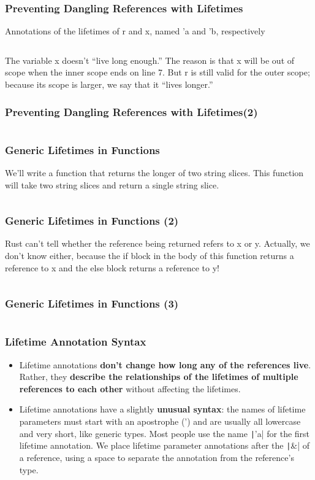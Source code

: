 \documentclass{beamer}
\begin{document}
\begin{frame}[fragile]
	\frametitle{Preventing Dangling References with Lifetimes}
	Annotations of the lifetimes of r and x, named 'a and 'b, respectively
	
	\inputminted{rust}{./code/dangling-ref.rs}
	
	The variable x doesn’t “live long enough.” The reason is that x will be out of scope when the inner scope ends on line 7. But r is still valid for the outer scope; because its scope is larger, we say that it “lives longer.” 
\end{frame}

\begin{frame}[fragile]
	\frametitle{Preventing Dangling References with Lifetimes(2)}
	\inputminted{shell}{./code/dangling-ref.shell}
\end{frame}


\begin{frame}[fragile]
	\frametitle{Generic Lifetimes in Functions}
	We’ll write a function that returns the longer of two string slices. This function will take two string slices and return a single string slice.
	
	\inputminted{rust}{./code/lifetime.rs}
\end{frame}



\begin{frame}[fragile]
	\frametitle{Generic Lifetimes in Functions (2)}
	Rust can’t tell whether the reference being returned refers to x or y. Actually, we don’t know either, because the if block in the body of this function returns a reference to x and the else block returns a reference to y!
	
	\inputminted{rust}{./code/lifetime2.rs}
\end{frame}


\begin{frame}[fragile]
	\frametitle{Generic Lifetimes in Functions (3)}
	\inputminted{shell}{./code/lifetime2.shell}
\end{frame}

\begin{frame}[fragile]
	\frametitle{Lifetime Annotation Syntax}
	\begin{itemize}
		\item 	Lifetime annotations \textbf{don’t change how long any of the references live}. Rather, they \textbf{describe the relationships of the lifetimes of multiple references to each other }without affecting the lifetimes.
		\item 	Lifetime annotations have a slightly \textbf{unusual syntax}: the names of lifetime parameters must start with an apostrophe (') and are usually all lowercase and very short, like generic types. Most people use the name \texttt|'a| for the first lifetime annotation. We place lifetime parameter annotations after the \texttt|&| of a reference, using a space to separate the annotation from the reference’s type.
		
		\inputminted{rust}{./code/lifetime3.rs}
	\end{itemize}
\end{frame}
\end{document}
